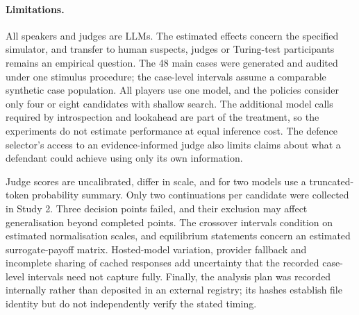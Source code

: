 \paragraph{Limitations.}
All speakers and judges are LLMs. The estimated effects concern the specified simulator, and transfer to human
suspects, judges or Turing-test participants remains an empirical question. The 48 main cases were generated and
audited under one stimulus procedure; the case-level intervals assume a comparable synthetic case population.
All players use one model, and the policies consider only four or eight candidates with shallow search. The
additional model calls required by introspection and lookahead are part of the treatment, so the experiments do
not estimate performance at equal inference cost. The defence selector's access to an evidence-informed judge
also limits claims about what a defendant could achieve using only its own information.

Judge scores are uncalibrated, differ in scale, and for two models use a truncated-token probability summary.
Only two continuations per candidate were collected in Study 2. Three decision points failed, and their exclusion
may affect generalisation beyond completed points. The crossover intervals condition on estimated normalisation
scales, and equilibrium statements concern an estimated surrogate-payoff matrix. Hosted-model variation,
provider fallback and incomplete sharing of cached responses add uncertainty that the recorded case-level
intervals need not capture fully. Finally, the analysis plan was recorded internally rather than deposited in an
external registry; its hashes establish file identity but do not independently verify the stated timing.
